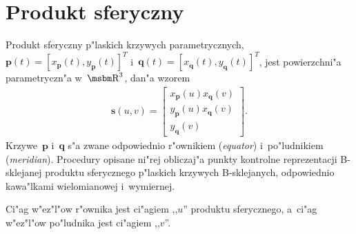 \newpage
\section{Produkt sferyczny}

\begin{sloppypar}
Produkt sferyczny p"laskich krzywych parametrycznych,
$\bm{p}(t)=[x_{\bm{p}}(t),y_{\bm{p}}(t)]^T$
i~$\bm{q}(t)=[x_{\bm{q}}(t),y_{\bm{q}}(t)]^T$,
jest powierzchni"a parametryczn"a w~$\R^3$, dan"a wzorem
\begin{align*}
  \bm{s}(u,v) = \left[\begin{array}{c}
    x_{\bm{p}}(u)x_{\bm{q}}(v) \\
    y_{\bm{p}}(u)x_{\bm{q}}(v) \\
    y_{\bm{q}}(v)
  \end{array}\right].
\end{align*}
Krzywe~$\bm{p}$ i~$\bm{q}$ s"a zwane odpowiednio r"ownikiem (\textsl{equator})
i~po"ludnikiem (\textsl{meridian}). Procedury opisane ni"rej obliczaj"a
punkty kontrolne reprezentacji B-sklejanej produktu sferycznego p"laskich
krzywych B-sklejanych, odpowiednio kawa"lkami wielomianowej i~wymiernej.%
\end{sloppypar}

Ci"ag w"ez"l"ow r"ownika jest ci"agiem ,,$u$'' produktu sferycznego,
a~ci"ag w"ez"l"ow po"ludnika jest ci"agiem ,,$v$''.

\vspace{\bigskipamount}

\vspace{\bigskipamount}

